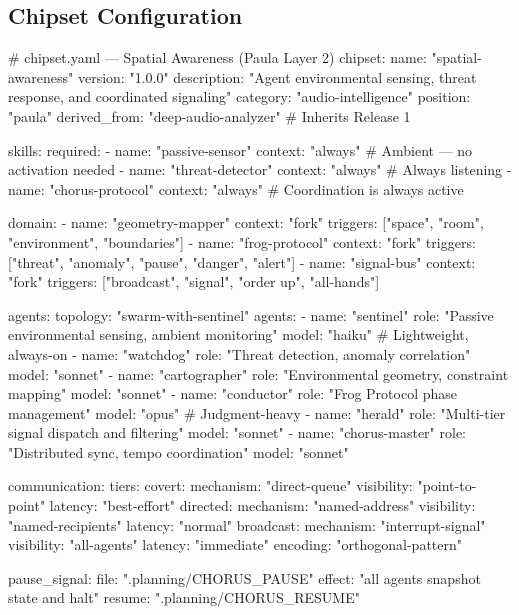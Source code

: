 \documentclass[11pt,letterpaper]{article}
\begin{document}
\subsection{Chipset Configuration}

\begin{asciibox}
# chipset.yaml — Spatial Awareness (Paula Layer 2)
chipset:
  name: "spatial-awareness"
  version: "1.0.0"
  description: "Agent environmental sensing, threat response,
                and coordinated signaling"
  category: "audio-intelligence"
  position: "paula"
  derived_from: "deep-audio-analyzer"  # Inherits Release 1

skills:
  required:
    - name: "passive-sensor"
      context: "always"     # Ambient — no activation needed
    - name: "threat-detector"
      context: "always"     # Always listening
    - name: "chorus-protocol"
      context: "always"     # Coordination is always active

  domain:
    - name: "geometry-mapper"
      context: "fork"
      triggers: ["space", "room", "environment", "boundaries"]
    - name: "frog-protocol"
      context: "fork"
      triggers: ["threat", "anomaly", "pause", "danger", "alert"]
    - name: "signal-bus"
      context: "fork"
      triggers: ["broadcast", "signal", "order up", "all-hands"]

agents:
  topology: "swarm-with-sentinel"
  agents:
    - name: "sentinel"
      role: "Passive environmental sensing, ambient monitoring"
      model: "haiku"         # Lightweight, always-on
    - name: "watchdog"
      role: "Threat detection, anomaly correlation"
      model: "sonnet"
    - name: "cartographer"
      role: "Environmental geometry, constraint mapping"
      model: "sonnet"
    - name: "conductor"
      role: "Frog Protocol phase management"
      model: "opus"          # Judgment-heavy
    - name: "herald"
      role: "Multi-tier signal dispatch and filtering"
      model: "sonnet"
    - name: "chorus-master"
      role: "Distributed sync, tempo coordination"
      model: "sonnet"

communication:
  tiers:
    covert:
      mechanism: "direct-queue"
      visibility: "point-to-point"
      latency: "best-effort"
    directed:
      mechanism: "named-address"
      visibility: "named-recipients"
      latency: "normal"
    broadcast:
      mechanism: "interrupt-signal"
      visibility: "all-agents"
      latency: "immediate"
      encoding: "orthogonal-pattern"

  pause_signal:
    file: ".planning/CHORUS_PAUSE"
    effect: "all agents snapshot state and halt"
    resume: ".planning/CHORUS_RESUME"


\end{asciibox}
\end{document}
